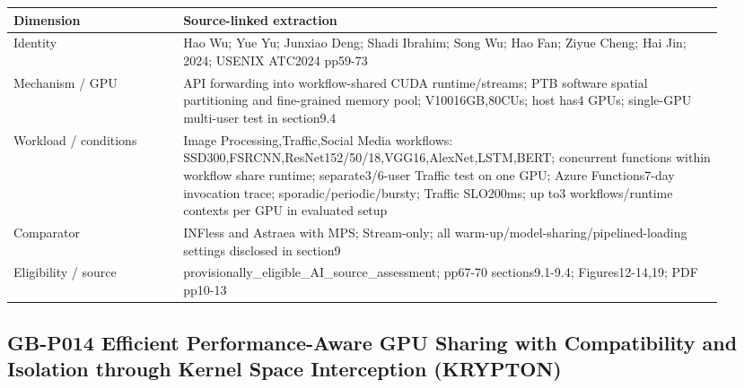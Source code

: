 \documentclass[12pt,a4paper]{article}
\begin{document}
{\small\begin{longtable}{>{\raggedright\arraybackslash}p{0.22\linewidth}>{\raggedright\arraybackslash}p{0.7\linewidth}}
\toprule
Dimension & Source-linked extraction\\\midrule
\endhead
Identity & Hao Wu; Yue Yu; Junxiao Deng; Shadi Ibrahim; Song Wu; Hao Fan; Ziyue Cheng; Hai Jin; 2024; USENIX ATC2024 pp59-73\\
Mechanism /\allowbreak{} GPU & API forwarding into workflow-shared CUDA runtime/\allowbreak{}streams; PTB software spatial partitioning and fine-grained memory pool; V10016GB,80CUs; host has4 GPUs; single-GPU multi-user test in section9.4\\
Workload /\allowbreak{} conditions & Image Processing,Traffic,Social Media workflows:\allowbreak{} SSD300,FSRCNN,ResNet152/\allowbreak{}50/\allowbreak{}18,VGG16,AlexNet,LSTM,BERT; concurrent functions within workflow share runtime; separate3/\allowbreak{}6-user Traffic test on one GPU; Azure Functions7-day invocation trace; sporadic/\allowbreak{}periodic/\allowbreak{}bursty; Traffic SLO200ms; up to3 workflows/\allowbreak{}runtime contexts per GPU in evaluated setup\\
Comparator & INFless and Astraea with MPS; Stream-only; all warm-up/\allowbreak{}model-sharing/\allowbreak{}pipelined-loading settings disclosed in section9\\
Eligibility /\allowbreak{} source & provisionally\_\allowbreak{}eligible\_\allowbreak{}AI\_\allowbreak{}source\_\allowbreak{}assessment; pp67-70 sections9.1-9.4; Figures12-14,19; PDF pp10-13\\
\bottomrule
\end{longtable}}

\subsection*{GB-P014 Efficient Performance-Aware GPU Sharing with Compatibility and Isolation through Kernel Space Interception (KRYPTON)}
\cite{GB-P014}
\end{document}
